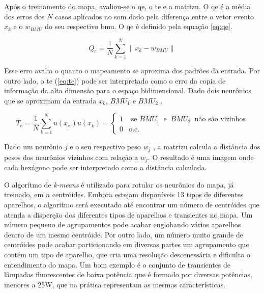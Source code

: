 Após o treinamento do mapa, avaliou-se o \gls{qe}, o
\gls{te} e a \gls{matrizu}. O \gls{qe} é a média
dos erros dos $N$ casos aplicados no \acs{som} dado pela diferença entre o
vetor evento $x_{k}$ e o $w_{BMU}$ do seu respectivo \gls{bmu}. O
\gls{qe} é definido pela equação \ref{eq:qe}.

\begin{equation}\label{eq:qe}
Q_{e} = \frac{1}{N}\sum_{k=1}^{N}\|x_{k}-w_{BMU}\|
\end{equation}

Esse erro avalia o quanto o mapeamento se aproxima dos padrões da
entrada. Por outro lado, o \acs{te} (\ref{eq:te}) pode ser
interpretado como o erro da copia de informação da alta dimensão para
o espaço bidimensional. Dado dois neurônios que se aproximam da
entrada $x_{k}$, $BMU_{1}$ e $BMU_{2}$ .

\begin{subequations}
\begin{equation}\label{eq:te}
T_{e} = \frac{1}{N}\sum_{k=1}^{N}u(x_{x})
\end{equation}
\begin{equation}
u(x_{k}) = \left\{\begin{array}{rl}
 1 &\text{ se } BMU_{1} \;\; \text{e} \;\; BMU_{2} \;\; \text{não são vizinhos} \\
 0 &\mbox{o.c.}\end{array}\right.
\end{equation}
\end{subequations}

Dado um neurônio $j$ e o seu respectivo peso $w_{j}$ , a \acs{matrizu}
calcula a distância dos pesos dos neurônios vizinhos com relação a
$w_{j}$. O resultado é uma imagem onde cada hexágono pode ser
interpretado como a distância calculada. 
	
O algorítmo de \emph{k-means} é utilizado para rotular os neurônios do
mapa, já treinado, em $n$ centróides. Embora estejam disponíveis 13
tipos de diferentes aparelhos, o algoritmo será executado até
encontrar um número de centróides que atenda a disperção dos
diferentes tipos de aparelhos e transientes no mapa. Um número pequeno
de agrupamentos pode acabar englobando vários aparelhos dentro de um
mesmo centróide.  Por outro lado, um número muito grande de centróides
pode acabar particionando em diversas partes um agrupamento que contém
um tipo de aparelho, que cria uma resolução descenessária e dificulta
o entendimento do mapa. Um bom exemplo é o conjunto de transientes de
lâmpadas fluorescentes de baixa potência que é formado por diversas
potências, menores a 25W, que na prática representam as mesmas
características.
	
